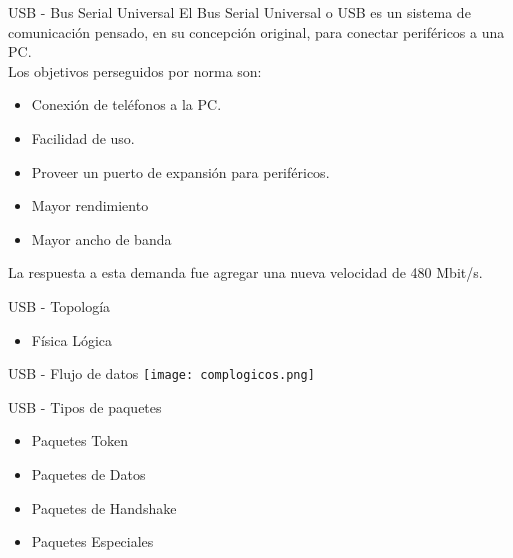 \begin{frame}{USB - Bus Serial Universal}
		El Bus Serial Universal o USB es un sistema de comunicación pensado, en su concepción original, para conectar periféricos a una PC.\\
		Los objetivos perseguidos por norma son:

	\begin{itemize}
		\item Conexión de teléfonos a la PC.
		\item Facilidad de uso.
		\item Proveer un puerto de expansión para periféricos.
		\item<2-> \alert {Mayor rendimiento}
		\item<2-> \alert {Mayor ancho de banda}
	\end{itemize}
	
	 {La respuesta a esta demanda fue agregar una nueva velocidad de 480 Mbit/s.}
	
\end{frame}
\begin{frame}{USB - Topología}
	\centering
	\begin{itemize}
		\item {} {Física} \only<2> {Lógica}
	\end{itemize}
\end{frame}
\begin{frame}{USB - Flujo de datos}
	\centering
	\texttt{[image: complogicos.png]}
\end{frame}
\begin{frame}{USB - Tipos de paquetes}
	\begin{itemize}
		\item Paquetes Token
		\item Paquetes de Datos
		\item Paquetes de Handshake
		\item Paquetes Especiales
	\end{itemize}
\end{frame}
